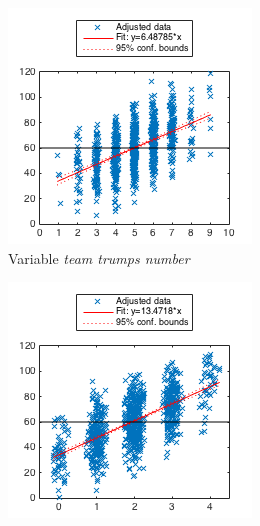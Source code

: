 \begin{figure}[h]
        \centering
        \begin{subfigure}[h]{0.32\textwidth}
                \includegraphics[width=\textwidth]{./img/4/teamTrumpsNumber}
                \caption{Variable \emph{team trumps number}}
                \label{fig:teamTrumpsNumber}
        \end{subfigure}
        \begin{subfigure}[h]{0.32\textwidth}
                \includegraphics[width=\textwidth]{./img/4/teamAcesNumber}

\end{subfigure}
\end{figure}
